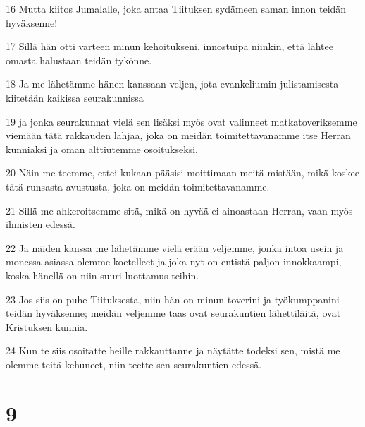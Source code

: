 \par 16 Mutta kiitos Jumalalle, joka antaa Tiituksen sydämeen saman innon teidän hyväksenne!
\par 17 Sillä hän otti varteen minun kehoitukseni, innostuipa niinkin, että lähtee omasta halustaan teidän tykönne.
\par 18 Ja me lähetämme hänen kanssaan veljen, jota evankeliumin julistamisesta kiitetään kaikissa seurakunnissa
\par 19 ja jonka seurakunnat vielä sen lisäksi myös ovat valinneet matkatoveriksemme viemään tätä rakkauden lahjaa, joka on meidän toimitettavanamme itse Herran kunniaksi ja oman alttiutemme osoitukseksi.
\par 20 Näin me teemme, ettei kukaan pääsisi moittimaan meitä mistään, mikä koskee tätä runsasta avustusta, joka on meidän toimitettavanamme.
\par 21 Sillä me ahkeroitsemme sitä, mikä on hyvää ei ainoastaan Herran, vaan myös ihmisten edessä.
\par 22 Ja näiden kanssa me lähetämme vielä erään veljemme, jonka intoa usein ja monessa asiassa olemme koetelleet ja joka nyt on entistä paljon innokkaampi, koska hänellä on niin suuri luottamus teihin.
\par 23 Jos siis on puhe Tiituksesta, niin hän on minun toverini ja työkumppanini teidän hyväksenne; meidän veljemme taas ovat seurakuntien lähettiläitä, ovat Kristuksen kunnia.
\par 24 Kun te siis osoitatte heille rakkauttanne ja näytätte todeksi sen, mistä me olemme teitä kehuneet, niin teette sen seurakuntien edessä.

\chapter{9}

